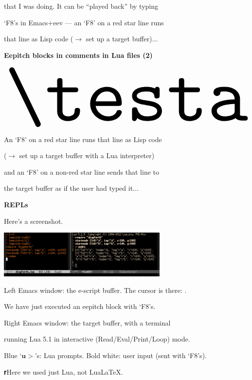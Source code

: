 \documentclass[oneside]{book}
\begin{document}
that I was doing. It can be ``played back'' by typing

`F8's in Emacs+eev --- an `F8' on a red star line runs

that line as Lisp code ($→$ set up a target buffer)...

\newpage

{\bf Eepitch blocks in comments in Lua files (2)}

%
\pu
$\myvcenter{\resizebox{!}{95pt}{\testa}}
$

An `F8' on a red star line runs that line as Lisp code

($→$ set up a target buffer with a Lua interpreter)

and an `F8' on a non-red star line sends that line to

the target buffer as if the user had typed it...


\newpage

%                              

{\bf REPLs}

Here's a screenshot.

\ssk

\includegraphics[width=240pt]{tug-slides-ss1.png}

{\footnotesize

Left Emacs window: the e-script buffer. The cursor is there:
{\color{RedOrangeDark}\vrule width 5pt height 7pt depth 1pt}.

We have just executed an eepitch block with `F8's.

\ssk

Right Emacs window: the target buffer, with a terminal

running Lua 5.1 in interactive (Read/Eval/Print/Loop) mode.

Blue `$𝐮>$'s: Lua prompts. Bold white: user input (sent with `F8's).

\ssk

{𝐫Here we used just Lua, not Lua\LaTeX.}

}
\end{document}
